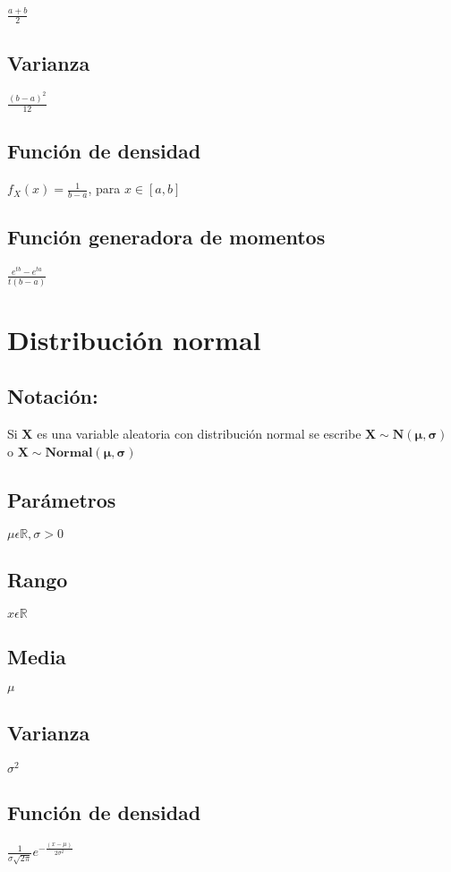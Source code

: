 \documentclass[es-lat]{article}
\begin{document}
$\frac{a+b}{2}$

\subsection{Varianza}

$\frac{(b-a)^2}{12}$

\subsection{Función de densidad}

$f_{X}(x)=\frac{1}{b-a}$, para $x\in [a,b]$

\subsection{Función generadora de momentos}

$\frac{e^{tb}-e^{ta}}{t(b-a)}$

\section{Distribución normal}

\subsection{Notación:}

Si $\mathbf{X}$ es una variable aleatoria con distribución normal se escribe $\mathbf{X\sim N(\mu,\sigma)}$ o $\mathbf{X\sim Normal(\mu,\sigma)}$

\subsection{Parámetros}
$\mu \epsilon \mathbb{R}, \sigma>0$

\subsection{Rango}
$x\epsilon\mathbb{R}$

\subsection{Media}
$\mu$

\subsection{Varianza}
$\sigma^2$

\subsection{Función de densidad}
$\frac{1}{\sigma\sqrt{2\pi}}e^{-\frac{(x-\mu)}{2\sigma^2}}$
\end{document}
